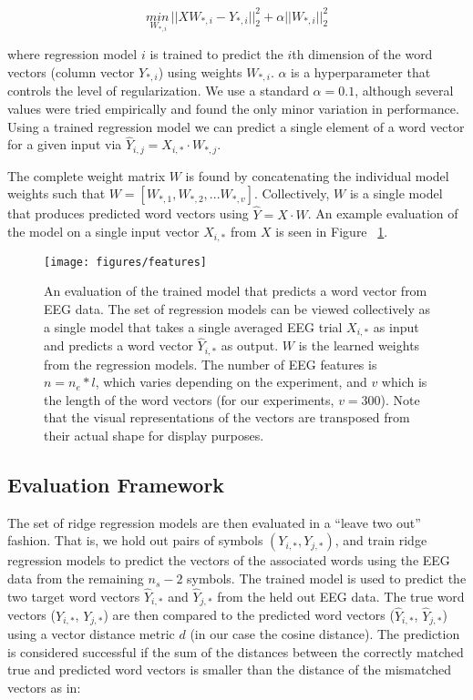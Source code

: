 \begin{equation}
  \underset{W_{*,i}}{min\,} {|| X W_{*, i} - Y_{*, i}||_2^2 + 
  \alpha ||W_{*, i}||_2^2}
  \label{eq:ridge}
\end{equation}

\noindent where regression model $i$ is trained to predict the $i$th dimension 
of the word vectors (column vector $Y_{*,i}$) using weights $W_{*,i}$. $\alpha$ 
is a hyperparameter that controls the level of regularization. We use a 
standard $\alpha = 0.1$, although several values were tried empirically and 
found the only minor variation in performance. Using a trained regression model 
we can predict a single element of a word vector for a given input via 
$\hat{Y}_{i,j} = X_{i, *} \cdot W_{*,j}$.

The complete weight matrix $W$ is found by concatenating the individual model 
weights such that $W = [ W_{*,1}, W_{*,2}, ... W_{*,v} ]$. Collectively, $W$ is 
a single model that produces predicted word vectors using $\hat{Y} = X \cdot 
W$. An example evaluation of the model on a single input vector $X_{i,*}$ from 
$X$ is seen in Figure ~\ref{fig:features}.

\begin{figure}[t]
  \centering
  \texttt{[image: figures/features]}
  \caption[Evaluation of the Trained Model]{
    An evaluation of the trained model that predicts a word vector from EEG 
    data.  The set of regression models can be viewed collectively as a single 
    model that takes a single averaged EEG trial $X_{i,*}$ as input and 
    predicts a word vector $\hat{Y}_{i,*}$ as output. $W$ is the learned 
    weights from the regression models. The number of EEG features is $n = n_e 
    * l$, which varies depending on the experiment, and $v$ which is the length 
    of the word vectors (for our experiments, $v=300$). Note that the visual 
    representations of the vectors are transposed from their actual shape for 
    display purposes.
  }
  \label{fig:features}
\end{figure}

\subsection{Evaluation Framework}
The set of ridge regression models are then evaluated in a ``leave two out'' 
fashion. That is, we hold out pairs of symbols $(Y_{i,*}, Y_{j,*})$, and train 
ridge regression models to predict the vectors of the associated words using 
the EEG data from the remaining $n_s-2$ symbols.  The trained model is used to 
predict the two target word vectors $\hat{Y}_{i,*}$ and $\hat{Y}_{j,*}$ from 
the held out EEG data. The true word vectors ($Y_{i,*}$, $Y_{j,*}$) are then 
compared to the predicted word vectors ($\hat{Y}_{i,*}$, $\hat{Y}_{j,*}$) using 
a vector distance metric $d$ (in our case the cosine distance). The prediction 
is considered successful if the sum of the distances between the correctly 
matched true and predicted word vectors is smaller than the distance of the 
mismatched vectors as in: 
  
